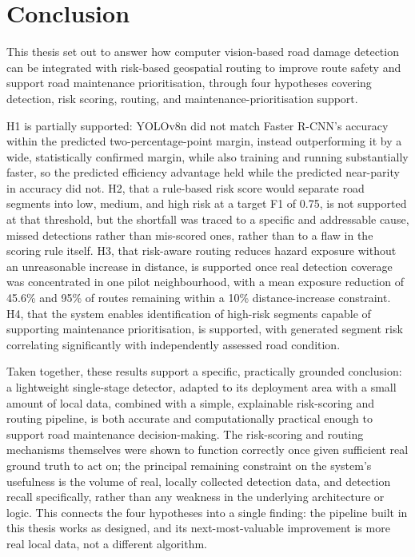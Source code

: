 \documentclass[10pt,a4paper,twocolumn]{article}
\begin{document}
\section{Conclusion}
\label{sec:conclusion}



\noindent
This thesis set out to answer how computer vision-based road damage
detection can be integrated with risk-based geospatial routing to improve
route safety and support road maintenance prioritisation, through four
hypotheses covering detection, risk scoring, routing, and
maintenance-prioritisation support.

H1 is partially supported: YOLOv8n did not match Faster R-CNN's accuracy
within the predicted two-percentage-point margin, instead outperforming
it by a wide, statistically confirmed margin, while also training and
running substantially faster, so the predicted efficiency advantage held
while the predicted near-parity in accuracy did not. H2, that a
rule-based risk score would separate road segments into low, medium, and
high risk at a target F1 of 0.75, is not supported at that threshold, but
the shortfall was traced to a specific and addressable cause, missed
detections rather than mis-scored ones, rather than to a flaw in the
scoring rule itself. H3, that risk-aware routing reduces hazard exposure
without an unreasonable increase in distance, is supported once real
detection coverage was concentrated in one pilot neighbourhood, with a
mean exposure reduction of 45.6\% and 95\% of routes remaining within a
10\% distance-increase constraint. H4, that the system enables
identification of high-risk segments capable of supporting maintenance
prioritisation, is supported, with generated segment risk correlating
significantly with independently assessed road condition.

Taken together, these results support a specific, practically grounded
conclusion: a lightweight single-stage detector, adapted to its
deployment area with a small amount of local data, combined with a
simple, explainable risk-scoring and routing pipeline, is both accurate
and computationally practical enough to support road maintenance
decision-making. The risk-scoring and routing mechanisms themselves were
shown to function correctly once given sufficient real ground truth to
act on; the principal remaining constraint on the system's usefulness is
the volume of real, locally collected detection data, and detection
recall specifically, rather than any weakness in the underlying
architecture or logic. This connects the four hypotheses into a single
finding: the pipeline built in this thesis works as designed, and its
next-most-valuable improvement is more real local data, not a different
algorithm.
\end{document}

